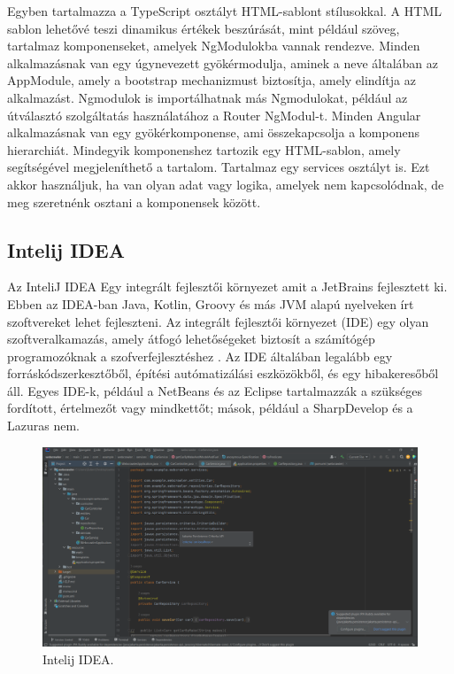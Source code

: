 Egyben tartalmazza a TypeScript osztályt HTML-sablont stílusokkal. A HTML sablon lehetővé teszi dinamikus értékek beszúrását, mint például szöveg, tartalmaz komponenseket, amelyek NgModulokba vannak rendezve. Minden alkalmazásnak van egy úgynevezett gyökérmodulja, aminek a neve általában az AppModule, amely a bootstrap mechanizmust biztosítja, amely elindítja az alkalmazást. Ngmodulok is importálhatnak más Ngmodulokat, például az útválasztó szolgáltatás használatához a Router NgModul-t.  Minden Angular alkalmazásnak van egy gyökérkomponense, ami összekapcsolja a komponens hierarchiát. Mindegyik komponenshez tartozik egy HTML-sablon, amely segítségével megjeleníthető a tartalom. Tartalmaz egy services osztályt is. Ezt akkor használjuk, ha van olyan adat vagy logika, amelyek nem kapcsolódnak, de meg szeretnénk osztani a komponensek között\cite{Angular}.


\subsection{Intelij IDEA}

Az InteliJ IDEA Egy integrált fejlesztői környezet amit a JetBrains fejlesztett ki. Ebben az IDEA-ban Java, Kotlin, Groovy és más JVM alapú nyelveken írt szoftvereket lehet fejleszteni. Az integrált fejlesztői környezet (IDE)  egy olyan  szoftveralkamazás, amely átfogó lehetőségeket biztosít a számítógép programozóknak a szofverfejlesztéshez . Az IDE általában legalább egy forráskódszerkesztőből, építési autómatizálási eszközökből, és egy hibakeresőből áll. Egyes IDE-k, például a NetBeans és az Eclipse tartalmazzák a szükséges fordított, értelmezőt vagy mindkettőt; mások, például a SharpDevelop és a Lazuras nem\cite{Intelij}\cite{Intelij2}.

\begin{figure}[h]
\centering
\includegraphics[scale=1]{images/Intelij.png}
\caption{Intelij IDEA.}
\label{fig:Intelij}
\end{figure}

